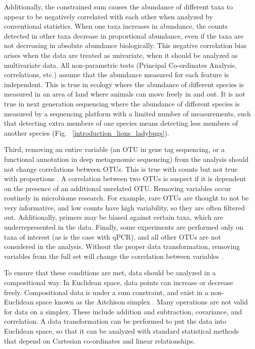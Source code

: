 Additionally, the constrained sum causes the abundance of different taxa to appear to be negatively correlated with each other when analyzed by conventional statistics. When one taxa increases in abundance, the counts detected in other taxa decrease in proportional abundance, even if the taxa are not decreasing in absolute abundance biologically. This negative correlation bias arises when the data are treated as univariate, when it should be analyzed as multivariate data. All non-parametric tests (Principal Co-ordinates Analysis, correlations, etc.) assume that the abundance measured for each feature is independent. This is true in ecology where the abundance of different species is measured in an area of land where animals can move freely in and out. It is not true in next generation sequencing where the abundance of different species is measured by a sequencing platform with a limited number of measurements, such that detecting extra members of one species means detecting less members of another species (Fig. ~\ref{introduction_lions_ladybugs}).

Third, removing an entire variable (an OTU in gene tag sequencing, or a functional annotation in deep metagenomic sequencing) from the analysis should not change correlations between OTUs. This is true with counts but not true with proportions \cite{lovell2015proportionality}. A correlation between two OTUs is suspect if it is dependent on the presence of an additional unrelated OTU. Removing variables occur routinely in microbiome research. For example, rare OTUs are thought to not be very informative, and low counts have high variability, so they are often filtered out. Additionally, primers may be biased against certain taxa, which are underrepresented in the data. Finally, some experiments are performed only on taxa of interest (as is the case with qPCR), and all other OTUs are not considered in the analysis. Without the proper data transformation, removing variables from the full set will change the correlation between variables \cite{aitchison1982statistical}.

To ensure that these conditions are met, data should be analyzed in a compositional way. In Euclidean space, data points can increase or decrease freely. Compositional data is under a sum constraint, and exist in a non-Euclidean space known as the Aitchison simplex \cite{aitchison1982statistical}. Many operations are not valid for data on a simplex. These include addition and subtraction, covariance, and correlation. A data transformation can be performed to put the data into Euclidean space, so that it can be analyzed with standard statistical methods that depend on Cartesian co-ordinates and linear relationships.

